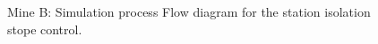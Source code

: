 \begin{appendices}
	\begin{figure}[h]
		\centering
		\caption{Mine B: Simulation process Flow diagram for the station isolation stope control.}
		\label{fig: Stope layout}
	\end{figure}

\end{appendices}
